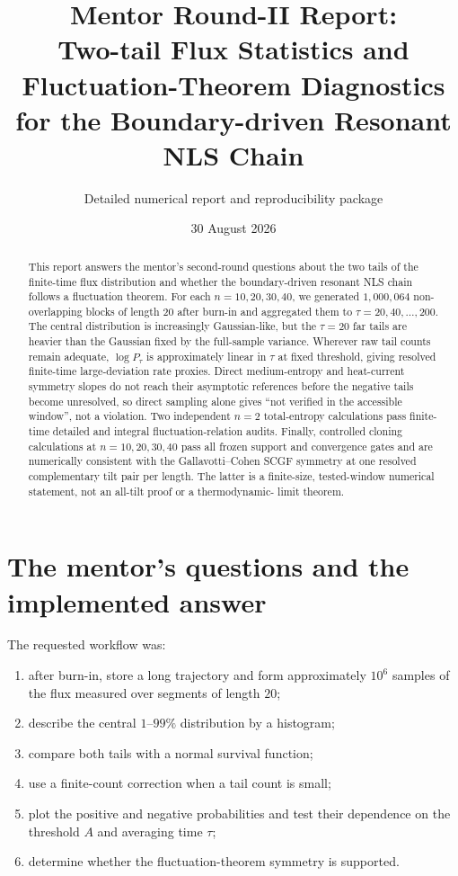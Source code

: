 \documentclass[11pt]{article}
\title{Mentor Round-II Report:\\
Two-tail Flux Statistics and Fluctuation-Theorem Diagnostics\\
for the Boundary-driven Resonant NLS Chain}
\author{Detailed numerical report and reproducibility package}
\date{30 August 2026}
\begin{document}
\maketitle

\begin{abstract}
This report answers the mentor's second-round questions about the two tails of
the finite-time flux distribution and whether the boundary-driven resonant
NLS chain follows a fluctuation theorem.  For each
$n=10,20,30,40$, we generated $1{,}000{,}064$ non-overlapping blocks of
length $20$ after burn-in and aggregated them to
$\tau=20,40,\ldots,200$.  The central distribution is increasingly
Gaussian-like, but the $\tau=20$ far tails are heavier than the Gaussian fixed
by the full-sample variance.  Wherever raw tail counts remain adequate,
$\log P_\tau$ is approximately linear in $\tau$ at fixed threshold, giving
resolved finite-time large-deviation rate proxies.  Direct medium-entropy and
heat-current symmetry slopes do not reach their asymptotic references before
the negative tails become unresolved, so direct sampling alone gives ``not
verified in the accessible window'', not a violation.  Two independent
$n=2$ total-entropy calculations pass finite-time detailed and integral
fluctuation-relation audits.  Finally, controlled cloning calculations at
$n=10,20,30,40$ pass all frozen support and convergence gates and are
numerically consistent with the Gallavotti--Cohen SCGF symmetry at one
resolved complementary tilt pair per length.  The latter is a finite-size,
tested-window numerical statement, not an all-tilt proof or a thermodynamic-
limit theorem.
\end{abstract}

\section{The mentor's questions and the implemented answer}

The requested workflow was:
\begin{enumerate}
\item after burn-in, store a long trajectory and form approximately $10^6$
      samples of the flux measured over segments of length $20$;
\item describe the central $1$--$99\%$ distribution by a histogram;
\item compare both tails with a normal survival function;
\item use a finite-count correction when a tail count is small;
\item plot the positive and negative probabilities and test their dependence
      on the threshold $A$ and averaging time $\tau$;
\item determine whether the fluctuation-theorem symmetry is supported.
\end{enumerate}
\end{document}
